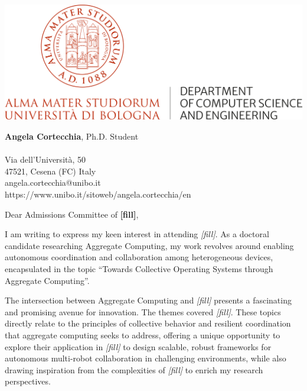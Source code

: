 \documentclass[12pt,a4paper]{letter} %
\makeatletter
\newcommand{\Who}{Angela Cortecchia} %
\newcommand{\Title}{Ph.D. Student} %
\newcommand{\Department}{Department of Computer Science and Engineering} %
\newcommand{\Affiliation}{Alma Mater Studiorum---Università di Bologna} %
\newcommand{\Address}{Via dell'Università, 50} %
\newcommand{\CityZip}{47521, Cesena (FC) Italy} %
\newcommand{\Email}{angela.cortecchia@unibo.it} %
\newcommand{\URL}{https://www.unibo.it/sitoweb/angela.cortecchia/en}
\makeatother
\begin{document}


\begin{minipage}{0.37\textwidth}
    \includegraphics[width=\textwidth]{images/DIP INFORMATICA-SCIENZA E INGEGNERIA_DISI_EN.png} %
\end{minipage}%
\hfill
\begin{minipage}{0.4\textwidth}
    \small
    \textbf{\Who{}}, \Title{} \\
    \vspace{0.01\textwidth} \\
    \scriptsize
    \Address{}\\
    \CityZip{}\\
    \Email{}\\
    \URL{}\\
\end{minipage}\label{fig:figure}

\vspace{10mm}

Dear Admissions Committee of \textbf{[fill]},

I am writing to express my keen interest in attending \textit{[fill]}.
%
As a doctoral candidate researching Aggregate Computing, 
my work revolves around enabling autonomous coordination and collaboration among heterogeneous devices, 
encapsulated in the topic ``Towards Collective Operating Systems through Aggregate Computing''.

The intersection between Aggregate Computing and \textit{[fill]} presents a fascinating and promising avenue for innovation. 
%
The themes covered \textit{[fill]}.
%
These topics directly relate to the principles of collective behavior and resilient coordination that aggregate computing seeks to address, 
offering a unique opportunity to explore their application in \textit{[fill]} to design scalable, 
robust frameworks for autonomous multi-robot collaboration in challenging environments,
while also drawing inspiration from the complexities of \textit{[fill]} to enrich my research perspectives.
\end{document}
